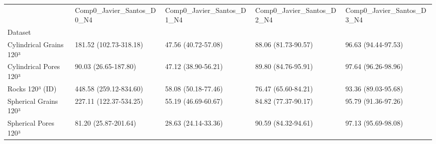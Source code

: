 \begin{tabular}{lllll}
\toprule
 & Comp0_Javier_Santos_D0_N4 & Comp0_Javier_Santos_D1_N4 & Comp0_Javier_Santos_D2_N4 & Comp0_Javier_Santos_D3_N4 \\
Dataset &  &  &  &  \\
\midrule
Cylindrical Grains 120³ & 181.52 (102.73-318.18) & 47.56 (40.72-57.08) & 88.06 (81.73-90.57) & 96.63 (94.44-97.53) \\
Cylindrical Pores 120³ & 90.03 (26.65-187.80) & 47.12 (38.90-56.21) & 89.80 (84.76-95.91) & 97.64 (96.26-98.96) \\
Rocks 120³ (ID) & 448.58 (259.12-834.60) & 58.08 (50.18-77.46) & 76.47 (65.60-84.21) & 93.36 (89.03-95.68) \\
Spherical Grains 120³ & 227.11 (122.37-534.25) & 55.19 (46.69-60.67) & 84.82 (77.37-90.17) & 95.79 (91.36-97.26) \\
Spherical Pores 120³ & 81.20 (25.87-201.64) & 28.63 (24.14-33.36) & 90.59 (84.32-94.61) & 97.13 (95.69-98.08) \\
\bottomrule
\end{tabular}
